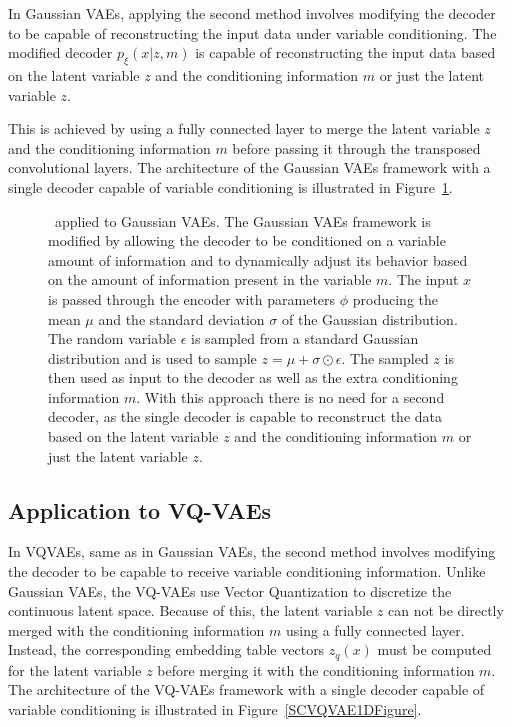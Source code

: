 In Gaussian VAEs, applying the second method involves modifying the decoder to be capable of reconstructing the input data under variable conditioning. The modified decoder $p_\xi(x|z,m)$ is capable of reconstructing the input data based on the latent variable $z$ and the conditioning information $m$ or just the latent variable $z$.

This is achieved by using a fully connected layer to merge the latent variable $z$ and the conditioning information $m$ before passing it through the transposed convolutional layers. The architecture of the Gaussian VAEs framework with a single decoder capable of variable conditioning is illustrated in Figure~\ref{SCVAE1DFigure}.



\begin{figure}[H]
    \centering
    
    \caption[ applied to Gaussian VAEs.]%
    {
        \methodTwo\ applied to Gaussian VAEs. The Gaussian VAEs framework is modified by allowing the decoder to be conditioned on a variable amount of information and to dynamically adjust its behavior based on the amount of information present in the variable $m$. The input $x$ is passed through the encoder with parameters $\phi$ producing the mean $\mu$ and the standard deviation $\sigma$ of the Gaussian distribution. The random variable $\epsilon$ is sampled from a standard Gaussian distribution and is used to sample $ z = \mu + \sigma \odot \epsilon$. The sampled $z$ is then used as input to the decoder as well as the extra conditioning information $m$. With this approach there is no need for a second decoder, as the single decoder is capable to reconstruct the data based on the latent variable $z$ and the conditioning information $m$ or just the latent variable $z$.
    }\label{SCVAE1DFigure}
\end{figure}

\subsection{Application to VQ-VAEs}

In VQVAEs, same as in Gaussian VAEs, the second method involves modifying the decoder to be capable to receive variable conditioning information. Unlike Gaussian VAEs, the VQ-VAEs use Vector Quantization to discretize the continuous latent space. Because of this, the latent variable $z$ can not be directly merged with the conditioning information $m$ using a fully connected layer. Instead, the corresponding embedding table vectors $z_q(x)$ must be computed for the latent variable $z$ before merging it with the conditioning information $m$. The architecture of the VQ-VAEs framework with a single decoder capable of variable conditioning is illustrated in Figure~\ref{SCVQVAE1DFigure}.

